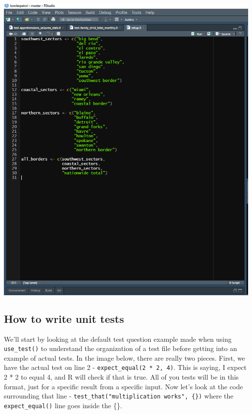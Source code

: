 \documentclass[
  12pt,
]{book}
\begin{document}
\includegraphics{images/test_setup.PNG}

\hypertarget{how-to-write-unit-tests}{%
\subsection{How to write unit tests}\label{how-to-write-unit-tests}}

We'll start by looking at the default test question example made when using \texttt{use\_test()} to understand the organization of a test file before getting into an example of actual tests. In the image below, there are really two pieces. First, we have the actual test on line 2 - \texttt{expect\_equal(2\ *\ 2,\ 4)}. This is saying, I expect 2 * 2 to equal 4, and R will check if that is true. All of you tests will be in this format, just for a specific result from a specific input. Now let's look at the code surrounding that line - \texttt{test\_that("multiplication\ works",\ \{\})} where the \texttt{expect\_equal()} line goes inside the \{\}.
\end{document}
